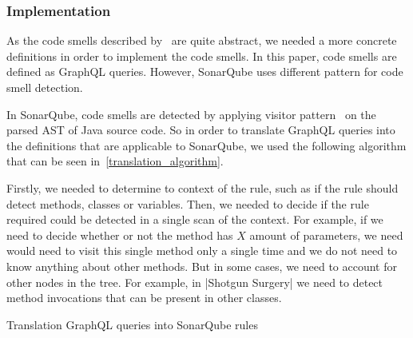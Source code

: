 
\subsubsection{Implementation}


As the code smells described by~\citeauthor{refactoring-fowler} are quite abstract, we needed
a more concrete definitions in order to implement the code smells.
In this paper, code smells are defined as GraphQL queries.
However, SonarQube uses different pattern for code smell detection.

In SonarQube, code smells are detected by applying visitor pattern~\cite{visitor_pattern} on the parsed
AST of Java source code.
So in order to translate GraphQL queries into the definitions that are applicable to SonarQube, we used the following
algorithm that can be seen in~\ref{translation_algorithm}.

Firstly, we needed to determine to context of the rule, such as if the rule should detect methods, classes or variables.
Then, we needed to decide if the rule required could be detected in a single scan of the context.
For example, if we need to decide whether or not the method has $X$ amount of parameters, we need would need to visit
this single method only a single time and we do not need to know anything about other methods.
But in some cases, we need to account for other nodes in the tree.
For example, in \verbatim|Shotgun Surgery| we need to detect method invocations that can be present in other classes.

\begin{algorithm}
    \label{translation_algorithm}
    \caption{Translation GraphQL queries into SonarQube rules}
    \BlankLine

\end{algorithm}

